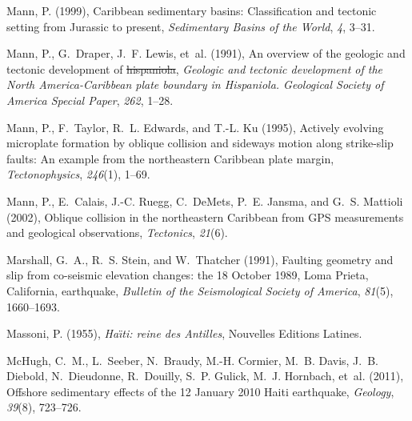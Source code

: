 \documentclass[linenumbers,draft]{agujournal}
\providecommand{\DIFaddtex}[1]{{\protect\color{blue}\uwave{#1}}} %
\providecommand{\DIFdeltex}[1]{{\protect\color{red}\sout{#1}}}                      %
\providecommand{\DIFaddbegin}{} %
\providecommand{\DIFaddend}{} %
\providecommand{\DIFdelbegin}{} %
\providecommand{\DIFdelend}{} %
\providecommand{\DIFadd}[1]{\texorpdfstring{\DIFaddtex{#1}}{#1}} %
\providecommand{\DIFdel}[1]{\texorpdfstring{\DIFdeltex{#1}}{}} %
\begin{document}
\begin{thebibliography}{65}
Mann, P. (1999), {Caribbean sedimentary basins: Classification and tectonic
  setting from Jurassic to present}, \textit{Sedimentary Basins of the World},
  \textit{4}, 3--31.

Mann, P., G.~Draper, J.~F. Lewis, et~al. (1991), \DIFaddbegin {\DIFaddend An overview of the geologic
  and tectonic development of \DIFdelbegin \DIFdel{hispaniola}\DIFdelend \DIFaddbegin \DIFadd{Hispaniola}}\DIFaddend , \textit{Geologic and tectonic
  development of the North America-Caribbean plate boundary in Hispaniola.
  Geological Society of America Special Paper}, \textit{262}, 1--28.

Mann, P., F.~Taylor, R.~L. Edwards, and T.-L. Ku (1995), Actively evolving
  microplate formation by oblique collision and sideways motion along
  strike-slip faults: {An} example from the northeastern {Caribbean} plate
  margin, \textit{Tectonophysics}, \textit{246}(1), 1--69.

Mann, P., E.~Calais, J.-C. Ruegg, C.~DeMets, P.~E. Jansma, and G.~S. Mattioli
  (2002), Oblique collision in the northeastern {Caribbean from GPS}
  measurements and geological observations, \textit{Tectonics}, \textit{21}(6).

Marshall, G.~A., R.~S. Stein, and W.~Thatcher (1991), {Faulting geometry and
  slip from co-seismic elevation changes: the 18 October 1989, Loma Prieta,
  California, earthquake}, \textit{Bulletin of the Seismological Society of
  America}, \textit{81}(5), 1660--1693.

Massoni, P. (1955), \textit{Ha{\"\i}ti: reine des {Antilles}}, Nouvelles
  Editions Latines.

McHugh, C.~M., L.~Seeber, N.~Braudy, M.-H. Cormier, M.~B. Davis, J.~B. Diebold,
  N.~Dieudonne, R.~Douilly, S.~P. Gulick, M.~J. Hornbach, et~al. (2011),
  Offshore sedimentary effects of the 12 {January 2010 Haiti} earthquake,
  \textit{Geology}, \textit{39}(8), 723--726.


\end{thebibliography}
\end{document}
